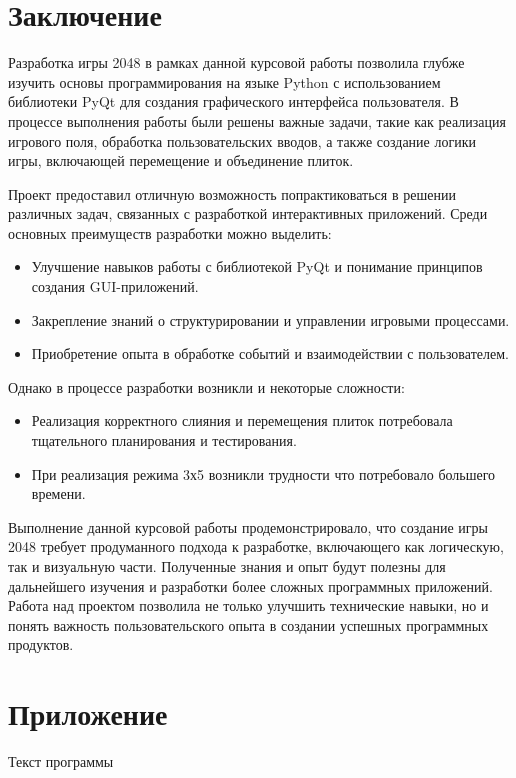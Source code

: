 \documentclass[14pt, oneside]{altsu-report}
\begin{document}
\chapter*{Заключение}
Разработка игры 2048 в рамках данной курсовой работы позволила глубже изучить основы программирования на языке Python с использованием библиотеки PyQt для создания графического интерфейса пользователя. В процессе выполнения работы были решены важные задачи, такие как реализация игрового поля, обработка пользовательских вводов, а также создание логики игры, включающей перемещение и объединение плиток.

Проект предоставил отличную возможность попрактиковаться в решении различных задач, связанных с разработкой интерактивных приложений. Среди основных преимуществ разработки можно выделить:
\begin{itemize}
\item Улучшение навыков работы с библиотекой PyQt и понимание принципов создания GUI-приложений.
\item Закрепление знаний о структурировании и управлении игровыми процессами.
\item Приобретение опыта в обработке событий и взаимодействии с пользователем.
\end{itemize}
Однако в процессе разработки возникли и некоторые сложности:
\begin{itemize}
\item	Реализация корректного слияния и перемещения плиток потребовала тщательного планирования и тестирования.
\item При реализация режима 3х5 возникли трудности что потребовало большего времени.
\end{itemize}
Выполнение данной курсовой работы продемонстрировало, что создание игры 2048 требует продуманного подхода к разработке, включающего как логическую, так и визуальную части. Полученные знания и опыт будут полезны для дальнейшего изучения и разработки более сложных программных приложений. Работа над проектом позволила не только улучшить технические навыки, но и понять важность пользовательского опыта в создании успешных программных продуктов.




\newpage
{}
\printbibliography[title={Список использованной литературы}]

\appendix
\newpage
\chapter*{\raggedleft\label{appendix1}Приложение}

\begin{center}
\label{code:appendix}Текст программы
\end{center}

\begin{code}
\vspace{-1cm}\inputminted{C}{src/game_mein.py}
\end{code}
\end{document}
